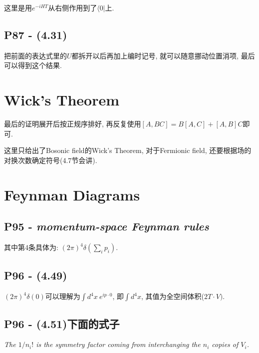 这里是用$e^{-iHT}$从右侧作用到了$\langle 0|$上.

\subsection{P87 - (4.31)}

把前面的表达式里的$U$都拆开以后再加上编时记号, 就可以随意挪动位置消项, 最后可以得到这个结果.

\section{Wick's Theorem}

最后的证明展开后按正规序排好, 再反复使用$[A, BC] = B[A, C] + [A, B]C$即可.

这里只给出了Bosonic field的Wick's Theorem, 对于Fermionic field, 还要根据场的对换次数确定符号(4.7节会讲).

\section{Feynman Diagrams}

\subsection{P95 - \textit{momentum-space Feynman rules}}

其中第4条具体为: $(2\pi)^4 \delta(\sum\limits_i p_i)$.

\subsection{P96 - (4.49)}

$(2\pi)^4 \delta(0)$可以理解为$\int d^4x\ e^{ip\cdot 0}$, 即$\int d^4x$, 其值为全空间体积($2T\cdot V)$.

\subsection{P96 - (4.51)下面的式子}

\textit{The $1/n_i !$ is the symmetry factor coming from interchanging the $n_i$ copies of $V_i$.}


